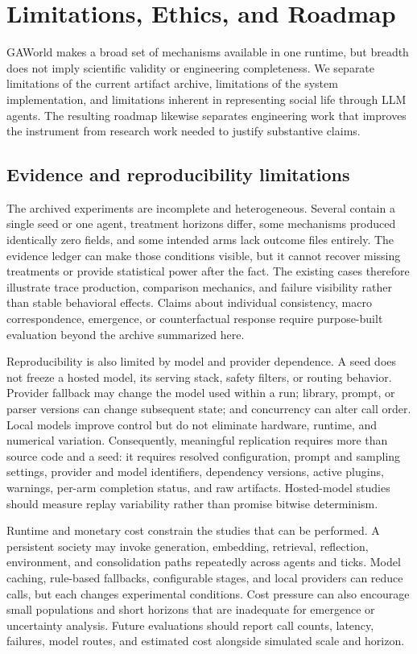\section{Limitations, Ethics, and Roadmap}
\label{sec:limitations-ethics-roadmap}

GAWorld makes a broad set of mechanisms available in one runtime, but breadth
does not imply scientific validity or engineering completeness.  We separate
limitations of the current artifact archive, limitations of the system
implementation, and limitations inherent in representing social life through
LLM agents.  The resulting roadmap likewise separates engineering work that
improves the instrument from research work needed to justify substantive
claims.

\subsection{Evidence and reproducibility limitations}

The archived experiments are incomplete and heterogeneous.  Several contain a
single seed or one agent, treatment horizons differ, some mechanisms produced
identically zero fields, and some intended arms lack outcome files entirely.
The evidence ledger can make those conditions visible, but it cannot recover
missing treatments or provide statistical power after the fact.  The existing
cases therefore illustrate trace production, comparison mechanics, and
failure visibility rather than stable behavioral effects.  Claims about
individual consistency, macro correspondence, emergence, or counterfactual
response require purpose-built evaluation beyond the archive summarized here.

Reproducibility is also limited by model and provider dependence.  A seed does
not freeze a hosted model, its serving stack, safety filters, or routing
behavior.  Provider fallback may change the model used within a run; library,
prompt, or parser versions can change subsequent state; and concurrency can
alter call order.  Local models improve control but do not eliminate hardware,
runtime, and numerical variation.  Consequently, meaningful replication
requires more than source code and a seed: it requires resolved configuration,
prompt and sampling settings, provider and model identifiers, dependency
versions, active plugins, warnings, per-arm completion status, and raw
artifacts.  Hosted-model studies should measure replay variability rather than
promise bitwise determinism.

Runtime and monetary cost constrain the studies that can be performed.  A
persistent society may invoke generation, embedding, retrieval, reflection,
environment, and consolidation paths repeatedly across agents and ticks.
Model caching, rule-based fallbacks, configurable stages, and local providers
can reduce calls, but each changes experimental conditions.  Cost pressure can
also encourage small populations and short horizons that are inadequate for
emergence or uncertainty analysis.  Future evaluations should report call
counts, latency, failures, model routes, and estimated cost alongside simulated
scale and horizon.

